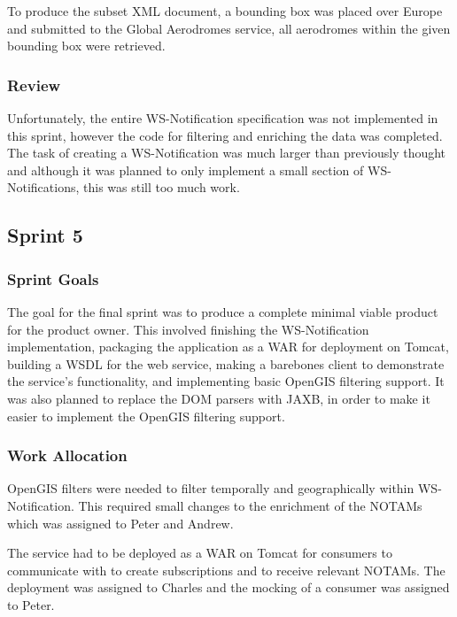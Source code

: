 \documentclass[a4paper, 12pt, twoside]{article}
\begin{document}
To produce the subset XML document, a bounding box was placed over Europe and submitted to the Global Aerodromes service, all aerodromes within the given bounding box were retrieved.

\subsubsection{Review}

Unfortunately, the entire WS-Notification specification was not implemented in this sprint, however the code for filtering and enriching the data was completed. The task of creating a WS-Notification was much larger than previously thought and although it was planned to only implement a small section of WS-Notifications, this was still too much work.

\subsection{Sprint 5}
\label{sec:impl_sprint_5}

\subsubsection{Sprint Goals}

The goal for the final sprint was to produce a complete minimal viable product for the product owner. This involved finishing the WS-Notification implementation, packaging the application as a WAR for deployment on Tomcat, building a WSDL for the web service, making a barebones client to demonstrate the service's functionality, and implementing basic OpenGIS filtering support. It was also planned to replace the DOM parsers with JAXB, in order to make it easier to implement the OpenGIS filtering support.

\subsubsection{Work Allocation}

OpenGIS filters were needed to filter temporally and geographically within WS-Notification. This required small changes to the enrichment of the NOTAMs which was assigned to Peter and Andrew.

The service had to be deployed as a WAR on Tomcat for consumers to communicate with to create subscriptions and to receive relevant NOTAMs. The deployment was assigned to Charles and the mocking of a consumer was assigned to Peter.
\end{document}
